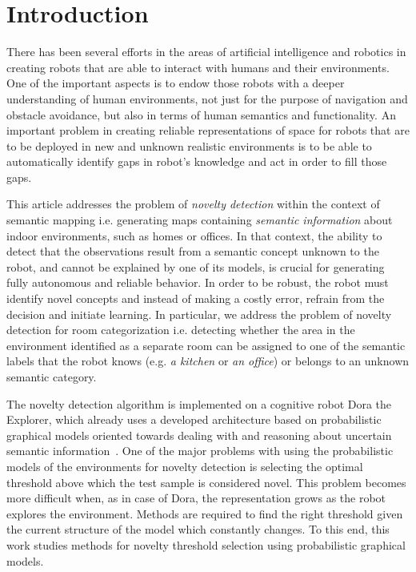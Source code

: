 \documentclass[runningheads,a4paper]{llncs}
\begin{document}
\section{Introduction}

There has been several efforts in the areas of artificial intelligence and robotics
in creating robots that are able to interact with humans and their environments.
One of the important aspects is to endow those robots with a deeper understanding
of human environments, not just for the purpose of navigation and obstacle avoidance, 
but also in terms of human semantics and functionality. An important problem
in creating reliable representations of space for robots that are to be deployed 
in new and unknown realistic environments is to be able to automatically 
identify gaps in robot's knowledge and act in order to fill those gaps. 

This article addresses the problem of \emph{novelty detection} within the context
of semantic mapping i.e. generating maps containing \emph{semantic information} 
about indoor environments, such as homes or offices. In that context, the ability 
to detect that the observations result from a semantic concept unknown to the robot, 
and cannot be explained by one of its models, is crucial for generating fully autonomous
and reliable behavior. In order to be robust, the robot must identify 
novel concepts and instead of making a costly error, refrain from the decision
and initiate learning. In particular, we address the problem of novelty detection for
room categorization i.e. detecting whether the area in the environment identified as a
separate room can be assigned to one of the semantic labels that the robot knows (e.g. \emph{a kitchen} 
or \emph{an office}) or belongs to an unknown semantic category.


The novelty detection algorithm is implemented on a cognitive robot Dora the Explorer,
which already uses a developed architecture based on probabilistic graphical models 
oriented towards dealing with and reasoning about uncertain semantic information~\cite{ijcai}.
One of the major problems with using the probabilistic models of the environments for novelty
detection is selecting the optimal threshold above which the test sample is considered
novel. This problem becomes more difficult when, as in case of Dora, the representation
grows as the robot explores the environment. Methods are required to find
the right threshold given the current structure of the model which constantly changes.
To this end, this work 
studies methods for novelty threshold selection using probabilistic graphical models.
\end{document}
